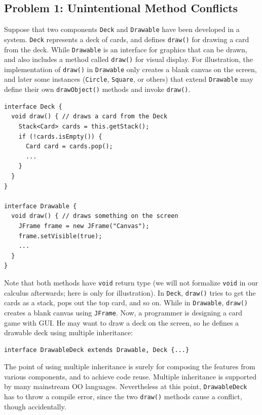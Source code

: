 \subsection{Problem 1: Unintentional Method Conflicts}
Suppose that two components \lstinline|Deck| and \lstinline|Drawable| 
have been developed in a system.  \lstinline|Deck| represents a deck
of cards, and defines \lstinline|draw()| for drawing a card from the
deck.  While \lstinline|Drawable| is an interface for graphics that
can be drawn, and also includes a method called \lstinline|draw()| for
visual display. For illustration, the implementation of
\lstinline|draw()| in \lstinline|Drawable| only creates a blank canvas
on the screen, and later some instances (\lstinline|Circle|,
\lstinline|Square|, or others) that extend \lstinline|Drawable| may
define their own \lstinline|drawObject()| methods and invoke
\lstinline|draw()|.

\vspace{3pt}\begin{lstlisting}
interface Deck {
  void draw() { // draws a card from the Deck
    Stack<Card> cards = this.getStack();
    if (!cards.isEmpty()) {
      Card card = cards.pop();
      ...
    }
  }
}

interface Drawable {
  void draw() { // draws something on the screen
    JFrame frame = new JFrame("Canvas");
    frame.setVisible(true);
    ...
  }
}
\end{lstlisting}\vspace{3pt}
Note that both methods have \lstinline|void| return type (we will not formalize
\lstinline|void| in our calculus afterwards; here is only for illustration). In \lstinline|Deck|, \lstinline|draw()| tries to get the cards as a stack, pops
out the top card, and so on. While in \lstinline|Drawable|, \lstinline|draw()|
creates a blank canvas using \lstinline|JFrame|. Now, a programmer is designing a
card game with GUI. He may want to draw a deck on the screen, so he defines a drawable
deck using multiple inheritance:

\vspace{3pt}\begin{lstlisting}
interface DrawableDeck extends Drawable, Deck {...} 
\end{lstlisting}\vspace{3pt}
The point of using multiple inheritance is surely for composing the features from various 
components, and to achieve code reuse. Multiple inheritance is supported by many mainstream OO
languages. Nevertheless at this point, \lstinline|DrawableDeck| has to throw a compile
error, since the two \lstinline|draw()| methods cause a conflict, though accidentally.

